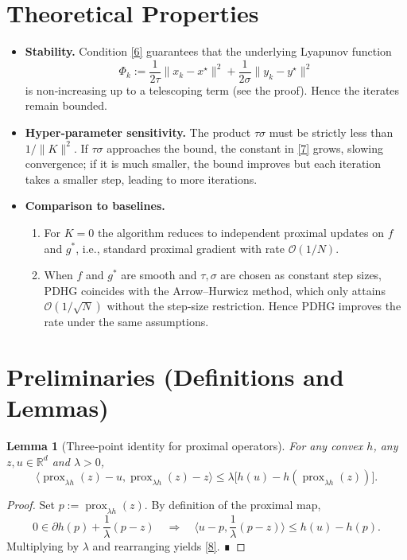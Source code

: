 \documentclass{article}
\newtheorem{lemma}{Lemma}
\newcommand{\prox}{\operatorname{prox}}
\newcommand{\inner}[2]{\langle #1,#2\rangle}
\newcommand{\norm}[1]{\|#1\|}
\begin{document}
\section*{Theoretical Properties}
\begin{itemize}
\item \textbf{Stability.} Condition \eqref{6} guarantees that the underlying Lyapunov function  
\[
\Phi_{k}:=\frac{1}{2\tau}\norm{x_{k}-x^{\star}}^{2}
+\frac{1}{2\sigma}\norm{y_{k}-y^{\star}}^{2}
\]
is non‑increasing up to a telescoping term (see the proof). Hence the iterates remain bounded.
\item \textbf{Hyper‑parameter sensitivity.} The product $\tau\sigma$ must be strictly less than $1/\|K\|^{2}$.  
If $\tau\sigma$ approaches the bound, the constant in \eqref{7} grows, slowing convergence; if it is much smaller, the bound improves but each iteration takes a smaller step, leading to more iterations.
\item \textbf{Comparison to baselines.}  
  \begin{enumerate}
  \item For $K=0$ the algorithm reduces to independent proximal updates on $f$ and $g^{*}$, i.e., standard proximal gradient with rate $\mathcal{O}(1/N)$.
  \item When $f$ and $g^{*}$ are smooth and $\tau,\sigma$ are chosen as constant step sizes, PDHG coincides with the Arrow–Hurwicz method, which only attains $\mathcal{O}(1/\sqrt{N})$ without the step‑size restriction. Hence PDHG improves the rate under the same assumptions.
  \end{enumerate}
\end{itemize}

\section*{Preliminaries (Definitions and Lemmas)}
\begin{lemma}[Three‑point identity for proximal operators]\label{lem:prox}
For any convex $h$, any $z,u\in\mathbb{R}^{d}$ and $\lambda>0$,
\[
\inner{\prox_{\lambda h}(z)-u}{\prox_{\lambda h}(z)-z}\le
\lambda\bigl[h(u)-h(\prox_{\lambda h}(z))\bigr].
\tag{8}
\]
\end{lemma}
\begin{proof}
Set $p:=\prox_{\lambda h}(z)$. By definition of the proximal map,
\[
0\in\partial h(p)+\frac{1}{\lambda}(p-z)
\quad\Longrightarrow\quad
\inner{u-p}{\frac{1}{\lambda}(p-z)}\le h(u)-h(p).
\]
Multiplying by $\lambda$ and rearranging yields \eqref{8}. ∎
\end{proof}
\end{document}
